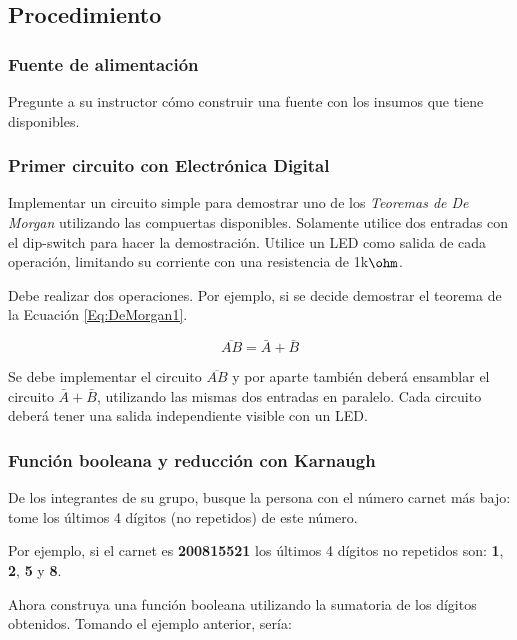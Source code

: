 \subsection{Procedimiento}
\subsubsection{Fuente de alimentación}
Pregunte a su instructor cómo construir una fuente con los insumos que tiene disponibles.

\subsubsection{Primer circuito con Electrónica Digital}
Implementar un circuito simple para demostrar uno de los \emph{Teoremas de De Morgan} utilizando las compuertas disponibles.
Solamente utilice dos entradas con el dip-switch para hacer la demostración.
Utilice un LED como salida de cada operación, limitando su corriente con una resistencia de 1k$\ohm$.

\vspace{14pt}

Debe realizar dos operaciones. Por ejemplo, si se decide demostrar el teorema de la Ecuación \ref{Eq:DeMorgan1}.

\begin{equation}
    \overline{A B} = \bar{A} + \bar{B}
    \label{Eq:DeMorgan1}
\end{equation}

Se debe implementar el circuito $\overline{A B}$ y por aparte también deberá ensamblar el circuito $\bar{A} + \bar{B}$, utilizando las mismas dos entradas en paralelo.
Cada circuito deberá tener una salida independiente visible con un LED.

\subsubsection{Función booleana y reducción con Karnaugh}
De los integrantes de su grupo, busque la persona con el número carnet más bajo: tome los últimos 4 dígitos (no repetidos) de este número.

\vspace{14pt}

Por ejemplo, si el carnet es \textbf{200815521} los últimos 4 dígitos no repetidos son: \textbf{1}, \textbf{2}, \textbf{5} y \textbf{8}.

\vspace{14pt}

Ahora construya una función booleana utilizando la sumatoria de los dígitos obtenidos. Tomando el ejemplo anterior, sería:

